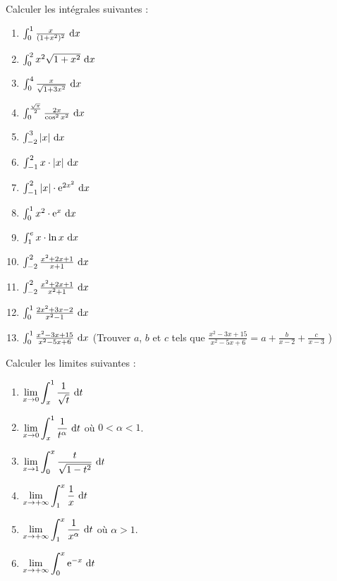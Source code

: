 %
\begin{exo}
      Calculer les int\'egrales suivantes : 
      \begin{enumerate}
            \item $ \int_{0}^{1} \frac{x}{(1+x^2)^2} ~\mathrm{d}x $
            \item $ \int_{0}^{2} x^2 \sqrt{1+x^2} ~\mathrm{d}x $
            \item $ \int_{0}^{4} \frac{x}{\sqrt{1+3x^2}} ~\mathrm{d}x $
            \item $ \int_{0}^{ \frac{ \sqrt{ \pi } }{2} } \frac{2x}{ \cos ^2 x^2 } ~\mathrm{d}x $
            \item $ \int_{-2}^{3} |x| ~\mathrm{d}x $
            \item $ \int_{-1}^{2} x \cdot |x| ~\mathrm{d}x $
            \item $ \int_{-1}^{2} |x| \cdot \mathrm{e}^{2x^2} ~\mathrm{d}x $
            \item $ \int_{0}^{1} x^2 \cdot \mathrm{e}^{x} ~\mathrm{d}x $
            \item $ \int_{1}^{e} x \cdot \ln x ~\mathrm{d}x  $
            \item $ \int_{-2}^{2} \frac{x^2 + 2x + 1}{x+1} ~\mathrm{d}x $
            \item $ \int_{-2}^{2} \frac{x^2 + 2x + 1}{x^2 + 1} ~\mathrm{d}x $
            \item $ \int_{0}^{1} \frac{2x^2 + 3x -2}{x^2-1} ~\mathrm{d}x $
            \item $ \int_{0}^{1} \frac{x^2 - 3x + 15}{x^2 -5x +6} ~\mathrm{d}x $ 
                  (Trouver $a$, $b$ et $c$ tels que
                  $ \frac{x^2 - 3x + 15}{x^2 -5x +6} = a+\frac{b}{x-2}+\frac{c}{x-3} $
                  )
      \end{enumerate}
\end{exo}
%
\begin{exo}
      Calculer les limites suivantes : 
      \begin{enumerate}
            \item $\displaystyle{ \lim_{x\rightarrow 0} \int_{x}^{1} \frac{1}{\sqrt{t}} ~\mathrm{d}t}$
            \item $\displaystyle{ \lim_{x\rightarrow 0} \int_{x}^{1} \frac{1}{t^{\alpha}} ~\mathrm{d}t}$ o\`u $0 < \alpha < 1$.
            \item $\displaystyle{ \lim_{x\rightarrow 1} \int_{0}^{x} \frac{t}{\sqrt{1-t^2}} ~\mathrm{d}t}$
            \item $\displaystyle{ \lim_{x\rightarrow +\infty} \int_{1}^{x} \frac{1}{x} ~\mathrm{d}t}$
            \item $\displaystyle{ \lim_{x\rightarrow +\infty} \int_{1}^{x} \frac{1}{x^{\alpha}} ~\mathrm{d}t}$ o\`u $\alpha > 1$.
            \item $\displaystyle{ \lim_{x\rightarrow +\infty} \int_{0}^{x} \mathrm{e}^{-x} ~\mathrm{d}t}$
      \end{enumerate}
\end{exo}
